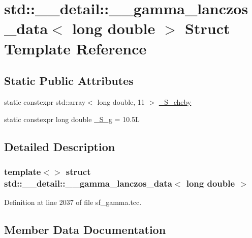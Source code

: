 \hypertarget{structstd_1_1____detail_1_1____gamma__lanczos__data_3_01long_01double_01_4}{}\section{std\+:\+:\+\_\+\+\_\+detail\+:\+:\+\_\+\+\_\+gamma\+\_\+lanczos\+\_\+data$<$ long double $>$ Struct Template Reference}
\label{structstd_1_1____detail_1_1____gamma__lanczos__data_3_01long_01double_01_4}
\subsection*{Static Public Attributes}
\begin{DoxyCompactItemize}
\item 
static constexpr std\+::array$<$ long double, 11 $>$ \hyperlink{structstd_1_1____detail_1_1____gamma__lanczos__data_3_01long_01double_01_4_a7968f4e72045e6a2b09244c678ddf3cc}{\+\_\+\+S\+\_\+cheby}
\item 
static constexpr long double \hyperlink{structstd_1_1____detail_1_1____gamma__lanczos__data_3_01long_01double_01_4_af86428283206e8b9bd3dc5709855c901}{\+\_\+\+S\+\_\+g} = 10.\+5L
\end{DoxyCompactItemize}


\subsection{Detailed Description}
\subsubsection*{template$<$$>$\newline
struct std\+::\+\_\+\+\_\+detail\+::\+\_\+\+\_\+gamma\+\_\+lanczos\+\_\+data$<$ long double $>$}



Definition at line 2037 of file sf\+\_\+gamma.\+tcc.



\subsection{Member Data Documentation}
\mbox{\label{structstd_1_1____detail_1_1____gamma__lanczos__data_3_01long_01double_01_4_a7968f4e72045e6a2b09244c678ddf3cc}} 
